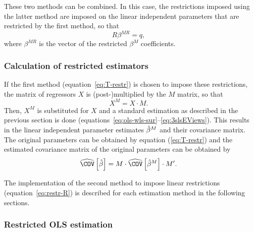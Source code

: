 These two methods can be combined.
In this case, the restrictions imposed using the latter method are
imposed on the linear independent parameters
that are restricted by the first method, so that
\begin{equation}
   R \beta^{MR} = q ,
\end{equation}
where $\beta^{MR}$ is the vector of the restricted $\beta^M$ coefficients.


\subsubsection{Calculation of restricted estimators}

If the first method (equation~\ref{eq:T-restr}) is chosen
to impose these restrictions,
the matrix of regressors $X$ is (post-)\hspace{0pt}multiplied
by the $M$ matrix,
so that
\begin{equation}
    X^M = X \cdot M .
\end{equation}
Then, $X^M$ is substituted for $X$ and a standard estimation as described
in the previous section is done
(equations~\ref{eq:ols-wls-sur}--\ref{eq:3slsEViews}).
This results in the linear independent parameter estimates $\hat{\beta}^M$ and
their covariance matrix.
The original parameters can be obtained by equation (\ref{eq:T-restr})
and the estimated covariance matrix of the original parameters
can be obtained by
\begin{equation}
   \COVHat \left[ \bHat \right]
   = M \cdot \COVHat \left[ \bHat^M \right] \cdot M' .
\end{equation}

The implementation of the second method to impose linear restrictions
(equation~\ref{eq:restr-R})
is described for each estimation method in the following sections.


\subsubsection{Restricted OLS estimation}

